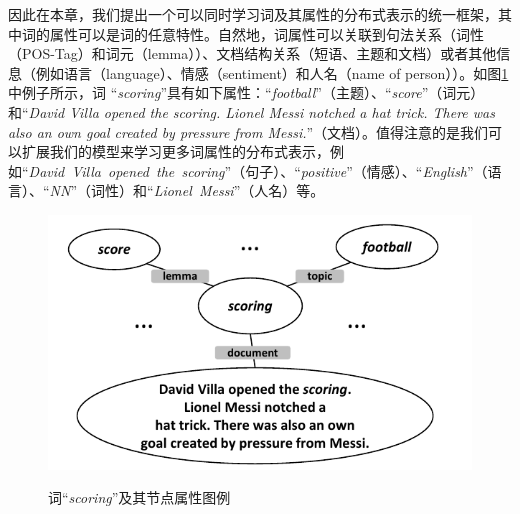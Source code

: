 \documentclass[master]{njuthesis}
\begin{document}
因此在本章，我们提出一个可以同时学习词及其属性的分布式表示的统一框架，其中词的属性可以是词的任意特性。自然地，词属性可以关联到句法关系（词性（POS-Tag）和词元（lemma））、文档结构关系（短语、主题和文档）或者其他信息（例如语言（language）、情感（sentiment）和人名（name of person））。如图\ref{fig:wtld_chap4}中例子所示，词 ``{\it scoring}''具有如下属性：``{\it football}''（主题）、``{\it score}''（词元）和``{\it David Villa opened the scoring. Lionel Messi notched a hat trick. There was also an own goal created by pressure from Messi.}''（文档）。值得注意的是我们可以扩展我们的模型来学习更多词属性的分布式表示，例如``{\it David\ Villa\ opened\ the\ scoring}''（句子）、``{\it positive}''（情感）、``{\it English}''（语言）、``{\it NN}''（词性）和``{\it Lionel\ Messi}''（人名）等。

\begin{figure}[t]
  \centering
  \includegraphics[width= 1.0\textwidth]{figures//word_topic_lemma_document_chap4.pdf}\\
  \caption{词``{\it scoring}''及其节点属性图例}\label{fig:wtld_chap4}
\end{figure}
\end{document}
